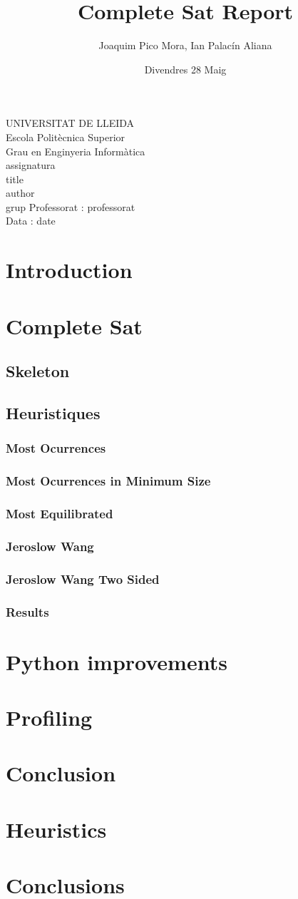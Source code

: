 \documentclass{article}
\title{Complete Sat Report}
\author{Joaquim Pico Mora, Ian Palacín Aliana}
\date{Divendres 28 Maig}
\renewcommand{\maketitle}{ %
	\begin{titlepage}
		\raggedright{UNIVERSITAT DE LLEIDA \\
			Escola Politècnica Superior \\
			Grau en Enginyeria Informàtica\\
			\1assignatura\\}
		\vspace{5cm}
		\centering\huge{\5title \\}
		\vspace{3cm}
		\large{\6author} \\
		\normalsize{\3grup}
		\vfill
		Professorat : \4professorat \\
		Data : \7date
\end{titlepage}}
\begin{document}
	\maketitle
	\thispagestyle{empty}


\section{Introduction}
\section{Complete Sat}
%
\subsection{Skeleton}
%
\subsection{Heuristiques}
%
\subsubsection{Most Ocurrences}
%
\subsubsection{Most Ocurrences in Minimum Size}
%
\subsubsection{Most Equilibrated}
%
\subsubsection{Jeroslow Wang}
%
\subsubsection{Jeroslow Wang Two Sided}
%
\subsubsection{Results}
%
\section{Python improvements}
%
\section{Profiling}
%
\section{Conclusion}
\section{Heuristics}
\section{Conclusions}
\end{document}
